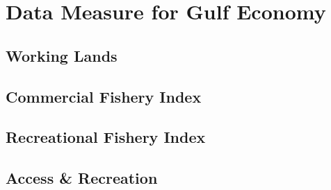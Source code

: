 \documentclass[]{book}
\begin{document}
\hypertarget{eco}{%
\chapter{Data Measure for Gulf Economy}\label{eco}}

\hypertarget{working-lands}{%
\section{Working Lands}\label{working-lands}}

\hypertarget{commercial-fishery-index}{%
\section{Commercial Fishery Index}\label{commercial-fishery-index}}

\hypertarget{recreational-fishery-index}{%
\section{Recreational Fishery Index}\label{recreational-fishery-index}}

\hypertarget{access-recreation}{%
\section{Access \& Recreation}\label{access-recreation}}


\end{document}

